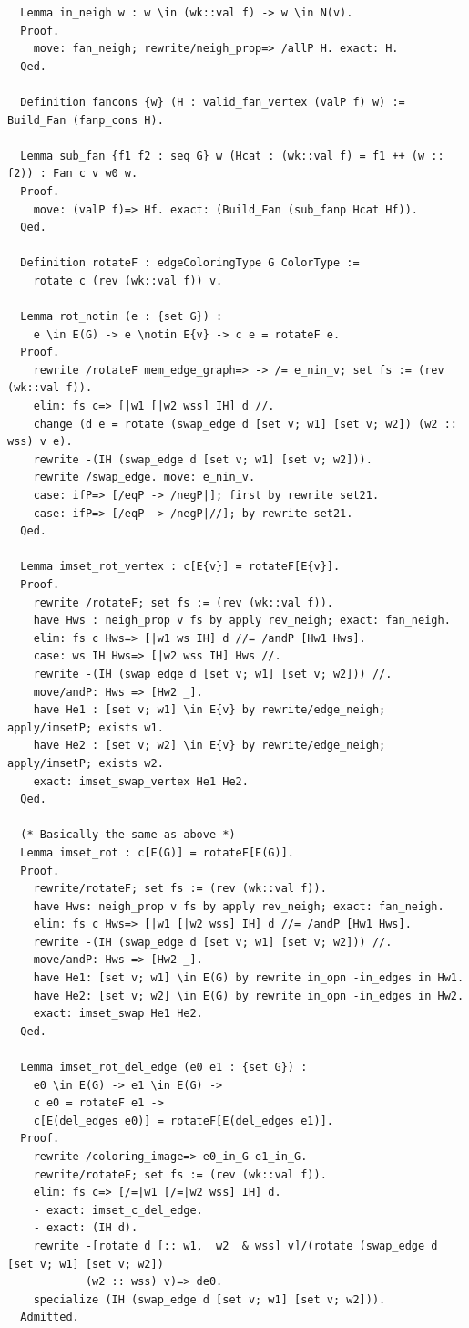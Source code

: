 \begin{verbatim}
  Lemma in_neigh w : w \in (wk::val f) -> w \in N(v).
  Proof. 
    move: fan_neigh; rewrite/neigh_prop=> /allP H. exact: H.
  Qed.

  Definition fancons {w} (H : valid_fan_vertex (valP f) w) := Build_Fan (fanp_cons H).

  Lemma sub_fan {f1 f2 : seq G} w (Hcat : (wk::val f) = f1 ++ (w :: f2)) : Fan c v w0 w.
  Proof.
    move: (valP f)=> Hf. exact: (Build_Fan (sub_fanp Hcat Hf)). 
  Qed.

  Definition rotateF : edgeColoringType G ColorType :=
    rotate c (rev (wk::val f)) v.

  Lemma rot_notin (e : {set G}) :
    e \in E(G) -> e \notin E{v} -> c e = rotateF e.
  Proof.
    rewrite /rotateF mem_edge_graph=> -> /= e_nin_v; set fs := (rev (wk::val f)).
    elim: fs c=> [|w1 [|w2 wss] IH] d //.
    change (d e = rotate (swap_edge d [set v; w1] [set v; w2]) (w2 :: wss) v e).
    rewrite -(IH (swap_edge d [set v; w1] [set v; w2])).
    rewrite /swap_edge. move: e_nin_v.
    case: ifP=> [/eqP -> /negP|]; first by rewrite set21.
    case: ifP=> [/eqP -> /negP|//]; by rewrite set21.
  Qed.

  Lemma imset_rot_vertex : c[E{v}] = rotateF[E{v}].
  Proof.
    rewrite /rotateF; set fs := (rev (wk::val f)).
    have Hws : neigh_prop v fs by apply rev_neigh; exact: fan_neigh.
    elim: fs c Hws=> [|w1 ws IH] d //= /andP [Hw1 Hws].
    case: ws IH Hws=> [|w2 wss IH] Hws //.
    rewrite -(IH (swap_edge d [set v; w1] [set v; w2])) //. 
    move/andP: Hws => [Hw2 _].
    have He1 : [set v; w1] \in E{v} by rewrite/edge_neigh; apply/imsetP; exists w1.
    have He2 : [set v; w2] \in E{v} by rewrite/edge_neigh; apply/imsetP; exists w2.
    exact: imset_swap_vertex He1 He2.
  Qed.

  (* Basically the same as above *)
  Lemma imset_rot : c[E(G)] = rotateF[E(G)].
  Proof.
    rewrite/rotateF; set fs := (rev (wk::val f)).
    have Hws: neigh_prop v fs by apply rev_neigh; exact: fan_neigh.
    elim: fs c Hws=> [|w1 [|w2 wss] IH] d //= /andP [Hw1 Hws].
    rewrite -(IH (swap_edge d [set v; w1] [set v; w2])) //. 
    move/andP: Hws => [Hw2 _].
    have He1: [set v; w1] \in E(G) by rewrite in_opn -in_edges in Hw1.
    have He2: [set v; w2] \in E(G) by rewrite in_opn -in_edges in Hw2.
    exact: imset_swap He1 He2.
  Qed.

  Lemma imset_rot_del_edge (e0 e1 : {set G}) : 
    e0 \in E(G) -> e1 \in E(G) ->  
    c e0 = rotateF e1 ->
    c[E(del_edges e0)] = rotateF[E(del_edges e1)].
  Proof.
    rewrite /coloring_image=> e0_in_G e1_in_G.
    rewrite/rotateF; set fs := (rev (wk::val f)).
    elim: fs c=> [/=|w1 [/=|w2 wss] IH] d.
    - exact: imset_c_del_edge. 
    - exact: (IH d). 
    rewrite -[rotate d [:: w1,  w2  & wss] v]/(rotate (swap_edge d [set v; w1] [set v; w2])
            (w2 :: wss) v)=> de0.
    specialize (IH (swap_edge d [set v; w1] [set v; w2])).
  Admitted.


\end{verbatim}
